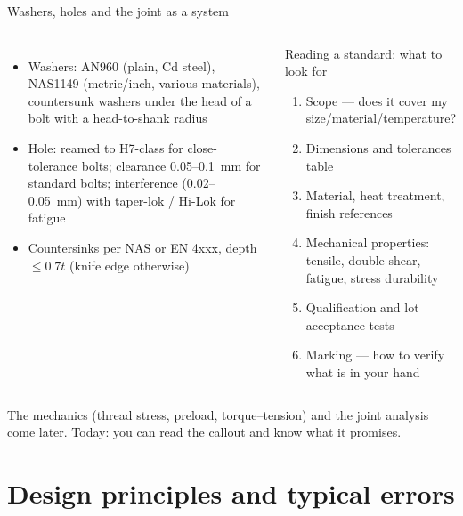 \documentclass[aspectratio=169,10pt]{beamer}
\begin{document}
\begin{frame}{Washers, holes and the joint as a system}
\footnotesize
\begin{columns}[T]
\begin{itemize}
  \item Washers: AN960 (plain, Cd steel), NAS1149 (metric/inch, various materials), countersunk washers under the head of a bolt with a head-to-shank radius
  \item Hole: reamed to H7-class for close-tolerance bolts; clearance \SI{0.05}{}--\SI{0.1}{mm} for standard bolts; interference (\SI{0.02}{}--\SI{0.05}{mm}) with taper-lok / Hi-Lok for fatigue
  \item Countersinks per NAS or EN 4xxx, depth $\le 0.7t$ (knife edge otherwise)
\end{itemize}
\begin{block}{Reading a standard: what to look for}
\begin{enumerate}
  \item Scope --- does it cover my size/material/temperature?
  \item Dimensions and tolerances table
  \item Material, heat treatment, finish references
  \item Mechanical properties: tensile, double shear, fatigue, stress durability
  \item Qualification and lot acceptance tests
  \item Marking --- how to verify what is in your hand
\end{enumerate}
\end{block}
\end{columns}
\vspace{4pt}
\small The mechanics (thread stress, preload, torque--tension) and the joint analysis come later. Today: you can read the callout and know what it promises.
\end{frame}

\section{Design principles and typical errors}
\end{document}
